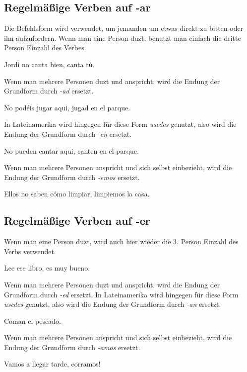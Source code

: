 \subsection*{Regelmäßige Verben auf -ar}
Die Befehlsform wird verwendet, um jemanden um etwas direkt
zu bitten oder ihn aufzufordern. Wenn man eine Person duzt,
benutzt man einfach die dritte Person Einzahl des Verbes.
\begin{ejemplos}
    \item Jordi no canta bien, canta t\'u.
\end{ejemplos}
Wenn man mehrere Personen duzt und anspricht, wird die 
Endung der Grundform durch \textit{-ad} ersetzt.
\begin{ejemplos}
    \item No pod\'eis jugar aqui, jugad en el parque.
\end{ejemplos}
In Lateinamerika wird hingegen für diese Form 
\textit{usedes} genutzt, also wird die Endung 
der Grundform durch \textit{-en} ersetzt.
\begin{ejemplos}
    \item No pueden cantar aqui, canten en el parque.
\end{ejemplos}
Wenn man mehrere Personen anspricht und sich selbst einbezieht,
wird die Endung der Grundform durch \textit{-emos} ersetzt.
\begin{ejemplos}
    \item Ellos no saben c\'omo limpiar, limpiemos la casa.
\end{ejemplos}
\subsection*{Regelmäßige Verben auf -er}
Wenn man eine Person duzt, wird auch hier wieder die 3. Person
Einzahl des Verbs verwendet.
\begin{ejemplos}
    \item Lee ese libro, es muy bueno.
\end{ejemplos}
Wenn man mehrere Personen duzt und anspricht, wird die 
Endung der Grundform durch \textit{-ed} ersetzt.
In Lateinamerika wird hingegen für diese Form \textit{usedes}
genutzt, also wird die Endung der Grundform durch \textit{-an} ersetzt.
\begin{ejemplos}
    \item Coman el pescado.
\end{ejemplos}
Wenn man mehrere Personen anspricht und sich selbst einbezieht,
wird die Endung der Grundform durch \textit{-amos} ersetzt.
\begin{ejemplos}
    \item Vamos a llegar tarde, corramos!
\end{ejemplos}
